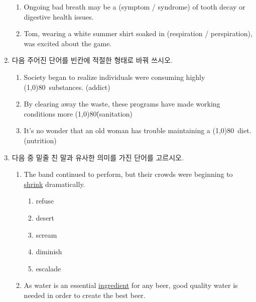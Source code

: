 \documentclass[a4wide,14pt]{extarticle}
\begin{document}
\begin{enumerate}[label=$\spadesuit$]
\begin{enumerate}[label={\textbf{\arabic*.}}, start=1]
	 	\item Ongoing bad breath may be a (symptom / syndrome) of tooth decay or digestive health
	 	issues.

	 	\item Tom, wearing a white summer shirt soaked in (respiration / perspiration), was excited
	 	about the game.

	\end{enumerate}


\item 다음 주어진 단어를 빈칸에 적절한 형태로 바꿔 쓰시오.

	\begin{enumerate}[label={\textbf{\arabic*.}}, start=1]

		\item Society began to realize individuals were consuming highly \line(1,0){80}\ substances. (addict)

		\item By clearing away the waste, these programs have made working conditions more \line(1,0){80}\. (sanitation)

		\item It's no wonder that an old woman has trouble maintaining a \line(1,0){80}\ diet. (nutrition)



	\end{enumerate}

\newpage

\item 다음 중 밑줄 친 말과 유사한 의미를 가진 단어를 고르시오.

	\begin{enumerate}[label={\textbf{\arabic*.}}, start=1]

		\item The band continued to perform, but their crowds were beginning to \underline{shrink} dramatically.

		\begin{enumerate}[label={(\alph*)}]
			\item refuse
			\item desert
			\item scream
			\item diminish
			\item escalade
		\end{enumerate}

		\item As water is an essential \underline{ingredient} for any beer, good quality water is needed in order to create the best beer.


\end{enumerate}
\end{enumerate}
\end{document}
